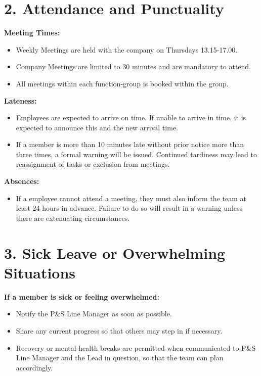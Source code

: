 \documentclass[a4paper,12pt]{article}
\begin{document}
\vspace{1em}
\section*{2. Attendance and Punctuality}
\vspace{0.5em} 

\textbf{Meeting Times:}
\begin{itemize}[leftmargin=2em]
    \item Weekly Meetings are held with the company on Thursdays 13.15-17.00.
    \item Company Meetings are limited to 30 minutes and are mandatory to attend.
    \item All meetings within each function-group is booked within the group.
\end{itemize}

\vspace{0.5em} 

\noindent\textbf{Lateness:}
\begin{itemize}[leftmargin=2em]
    \item Employees are expected to arrive on time. If unable to arrive in time, it is expected to announce this and the new arrival time.
    \item If a member is more than 10 minutes late without prior notice more than three times, a formal warning will be issued. Continued tardiness may lead to reassignment of tasks or exclusion from meetings.
\end{itemize}

\vspace{0.5em} 
\noindent\textbf{Absences:}
\begin{itemize}[leftmargin=2em]
    \item If a employee cannot attend a meeting, they must also inform the team at least 24 hours in advance. Failure to do so will result in a warning unless there are extenuating circumstances.
\end{itemize}

\vspace{1em}

\section*{3. Sick Leave or Overwhelming Situations}
\vspace{0.5em} 

\textbf{If a member is sick or feeling overwhelmed:}
\begin{itemize}[leftmargin=2em]
    \item Notify the P\&S Line Manager as soon as possible.
    \item Share any current progress so that others may step in if necessary.
    \item Recovery or mental health breaks are permitted when communicated to P\&S Line Manager and the Lead in question, so that the team can plan accordingly.
\end{itemize}
\end{document}
